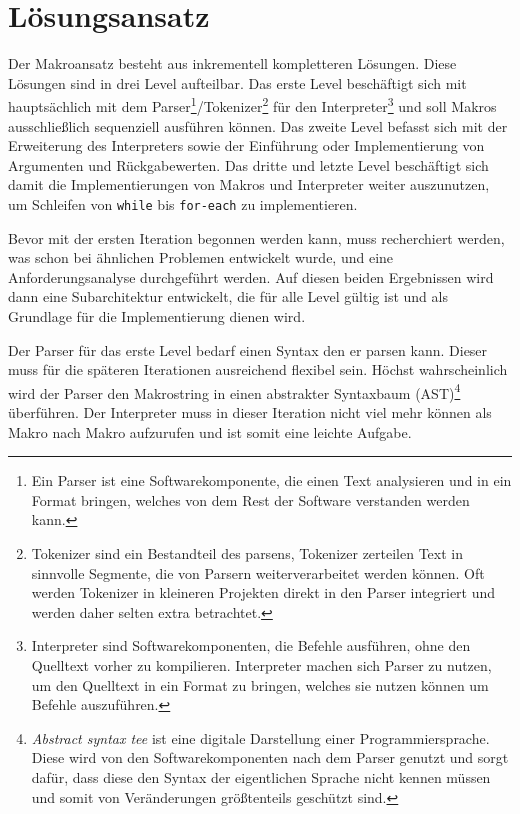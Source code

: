 \section{Lösungsansatz}
\label{sec:loesungsansatz}
  Der Makroansatz besteht aus inkrementell kompletteren Lösungen. Diese Lösungen sind in drei Level aufteilbar. Das erste Level beschäftigt sich mit hauptsächlich mit dem Parser\footnote{
    Ein Parser ist eine Softwarekomponente, die einen Text analysieren und in ein Format bringen, welches von dem Rest der Software verstanden werden kann.
  }/Tokenizer\footnote{
    Tokenizer sind ein Bestandteil des parsens, Tokenizer zerteilen Text in sinnvolle Segmente, die von Parsern weiterverarbeitet werden können. Oft werden Tokenizer in kleineren Projekten direkt in den Parser integriert und werden daher selten extra betrachtet.
  } für den Interpreter\footnote{
    Interpreter sind Softwarekomponenten, die Befehle ausführen, ohne den Quelltext vorher zu kompilieren. Interpreter machen sich Parser zu nutzen, um den Quelltext in ein Format zu bringen, welches sie nutzen können um Befehle auszuführen.
  } und soll Makros ausschließlich sequenziell ausführen können. Das zweite Level befasst sich mit der Erweiterung des Interpreters sowie der Einführung oder Implementierung von Argumenten und Rückgabewerten. Das dritte und letzte Level beschäftigt sich damit die Implementierungen von Makros und Interpreter weiter auszunutzen, um Schleifen von \texttt{while} bis \texttt{for-each} zu implementieren.

  Bevor mit der ersten Iteration begonnen werden kann, muss recherchiert werden, was schon bei ähnlichen Problemen entwickelt wurde, und eine Anforderungsanalyse durchgeführt werden. Auf diesen beiden Ergebnissen wird dann eine Subarchitektur entwickelt, die für alle Level gültig ist und als Grundlage für die Implementierung dienen wird.

  Der Parser für das erste Level bedarf einen Syntax den er parsen kann. Dieser muss für die späteren Iterationen ausreichend flexibel sein. Höchst wahrscheinlich wird der Parser den Makrostring in einen abstrakter Syntaxbaum (AST)\footnote{
    \textit{Abstract syntax tee} ist eine digitale Darstellung einer Programmiersprache. Diese wird von den Softwarekomponenten nach dem Parser genutzt und sorgt dafür, dass diese den Syntax der eigentlichen Sprache nicht kennen müssen und somit von Veränderungen größtenteils geschützt sind.
  } überführen. Der Interpreter muss in dieser Iteration nicht viel mehr können als Makro nach Makro aufzurufen und ist somit eine leichte Aufgabe.

